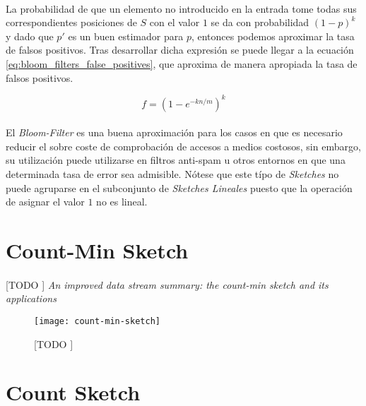 \documentclass{subfiles}
\begin{document}
      \paragraph{}
      La probabilidad de que un elemento no introducido en la entrada tome todas sus correspondientes posiciones de $S$ con el valor $1$ se da con probabilidad $(1-p)^k$ y dado que $p'$ es un buen estimador para $p$, entonces podemos aproximar la tasa de falsos positivos. Tras desarrollar dicha expresión se puede llegar a la ecuación \eqref{eq:bloom_filters_false_positives}, que aproxima de manera apropiada la tasa de falsos positivos.

      \begin{equation}
      \label{eq:bloom_filters_false_positives}
        f = (1-e^{-kn/m})^k
      \end{equation}

      \paragraph{}
      El \emph{Bloom-Filter} es una buena aproximación para los casos en que es necesario reducir el sobre coste de comprobación de accesos a medios costosos, sin embargo, su utilización puede utilizarse en filtros anti-spam u otros entornos en que una determinada tasa de error sea admisible. Nótese que este típo de \emph{Sketches} no puede agruparse en el subconjunto de \emph{Sketches Lineales} puesto que la operación de asignar el valor $1$ no es lineal.

    \section{Count-Min Sketch}
    \label{sec:count_min_sketch}

      \paragraph{}
      [TODO ] \emph{An improved data stream summary: the count-min sketch and its applications} \cite{cormode2005improved}

      \begin{figure}
        \centering
        \texttt{[image: count-min-sketch]}
        \caption{[TODO ]}
        \label{fig:count_ming_sketch}
      \end{figure}


    \section{Count Sketch}
    \label{sec:count_sketch}
\end{document}

